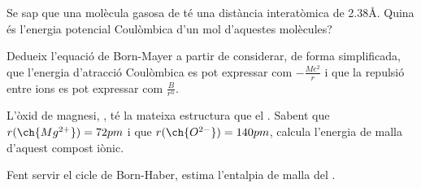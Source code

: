 \begin{exr}
Se sap que una molècula gasosa de  té una distància interatòmica de 2.38\AA. Quina és l'energia potencial Coulòmbica d'un mol d'aquestes molècules?
\end{exr}
\begin{exr}
    Dedueix l'equació de Born-Mayer a partir de considerar, de forma simplificada, que l'energia d'atracció Coulòmbica es pot expressar com $-\frac{Me^2}{r}$ i que la repulsió entre ions es pot expressar com $\frac{B}{r^n}$.
    \end{exr}
    \begin{exr}
    L'òxid de magnesi, , té la mateixa estructura que el . Sabent que $r(\ch{Mg^{2+}})=72pm$ i que $r(\ch{O^{2-}})=140pm$, calcula l'energia de malla d'aquest compost iònic.
    \end{exr}
    
    \begin{exr}
    Fent servir el cicle de Born-Haber, estima l'entalpia de malla del .
    \end{exr}